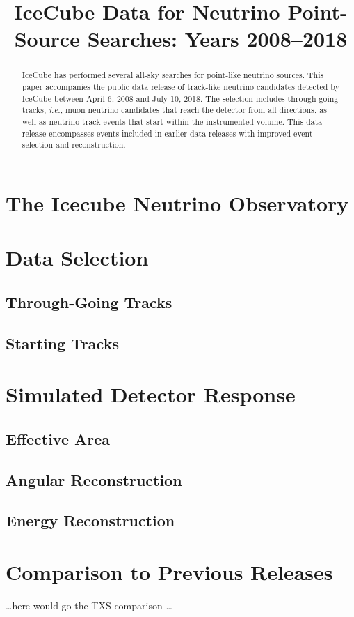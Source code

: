 \documentclass[aps,10pt,prd,twocolumn,floats,letterpaper,showpacs,nofootinbib,bibnotes,notitlepage,superscriptaddress]{revtex4-1}
\begin{document}
\title{IceCube Data for Neutrino Point-Source Searches: Years 2008--2018}



\pacs{}

\begin{abstract}
IceCube has performed several all-sky searches for point-like neutrino sources. This paper accompanies the public data release of track-like neutrino candidates detected by IceCube between April 6, 2008 and July 10, 2018. The selection includes through-going tracks, {\it i.e.}, muon neutrino candidates that reach the detector from all directions, as well as neutrino track events that start within the instrumented volume. This data release encompasses events included in earlier data releases with improved event selection and reconstruction.
\end{abstract}

\maketitle

\section{The Icecube Neutrino Observatory}

\section{Data Selection}

\subsection{Through-Going Tracks}

\subsection{Starting Tracks}

\section{Simulated Detector Response}

\subsection{Effective Area}

\subsection{Angular Reconstruction}

\subsection{Energy Reconstruction}

\section{Comparison to Previous Releases}

{\ldots here would go the TXS comparison \ldots}

\begin{acknowledgements}

\end{acknowledgements}
\end{document}
